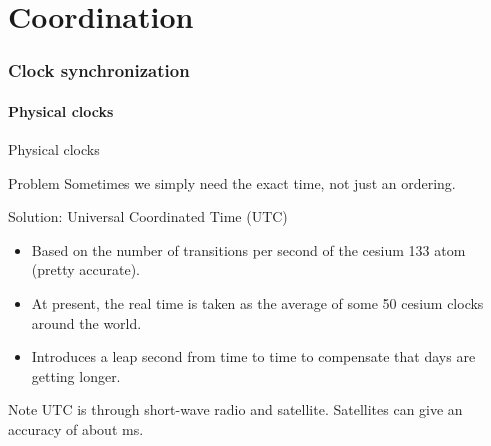 \part{Coordination}
\section{Clock synchronization}
\subsection{Physical clocks}
\begin{slide}{Physical clocks}
  \begin{alertblock}{Problem}
    Sometimes we simply need the exact time, not just an ordering.
  \end{alertblock}
  \begin{block}{Solution: Universal Coordinated Time (UTC)}
    \begin{itemize}\tightlist
    \item Based on the number of transitions per second of the cesium 133 atom (pretty accurate).
    \item At present, the real time is taken as the average of some 50 cesium clocks around the world.
    \item Introduces a leap second from time to time to compensate that days are getting longer.
    \end{itemize}
  \end{block}
  \begin{block}{Note}
    UTC is  through short-wave radio and satellite. Satellites can give an accuracy of about
     ms.
  \end{block}
\end{slide}
